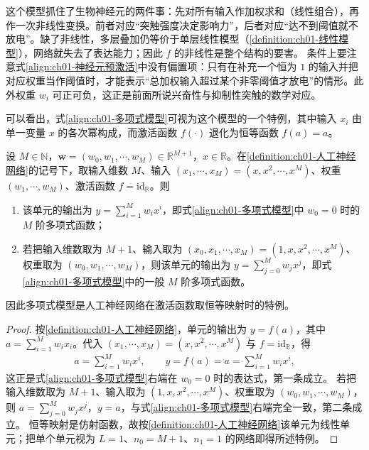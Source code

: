 \documentclass[../../main.tex]{subfiles}
\begin{document}
\begin{remark}
这个模型抓住了生物神经元的两件事：先对所有输入作加权求和（线性组合），再作一次非线性变换。前者对应“突触强度决定影响力”，后者对应“达不到阈值就不放电”。缺了非线性，多层叠加仍等价于单层线性模型（\cref{definition:ch01-线性模型}），网络就失去了表达能力；因此 $f$ 的非线性是整个结构的要害。
条件上要注意式\eqref{align:ch01-神经元预激活}中没有偏置项：只有在补充一个恒为 $1$ 的输入并把对应权重当作阈值时，才能表示“总加权输入超过某个非零阈值才放电”的情形。此外权重 $w_i$ 可正可负，这正是前面所说兴奋性与抑制性突触的数学对应。
\end{remark}

可以看出，式\eqref{align:ch01-多项式模型}可视为这个模型的一个特例，其中输入 $x_i$ 由单一变量 $x$ 的各次幂构成，而激活函数 $f(\cdot)$ 退化为恒等函数 $f(a)=a$。

\begin{proposition}[多项式函数是神经元模型的特例]\label{proposition:ch01-多项式是神经元特例}
设 $M\in\mathbb{N}$，$\mathbf{w}=(w_0,w_1,\cdots,w_M)\in\mathbb{R}^{M+1}$，$x\in\mathbb{R}$。在\cref{definition:ch01-人工神经网络}的记号下，取输入维数 $M$、输入 $(x_1,\cdots,x_M)=(x,x^{2},\cdots,x^{M})$、权重 $(w_1,\cdots,w_M)$、激活函数 $f=\mathrm{id}_{\mathbb{R}}$。则
\begin{enumerate}
  \item 该单元的输出为 $y=\sum_{i=1}^{M}w_ix^{i}$，即式\eqref{align:ch01-多项式模型}中 $w_0=0$ 时的 $M$ 阶多项式函数；
  \item 若把输入维数取为 $M+1$、输入取为 $(x_0,x_1,\cdots,x_M)=(1,x,x^{2},\cdots,x^{M})$、权重取为 $(w_0,w_1,\cdots,w_M)$，则该单元的输出为 $y=\sum_{j=0}^{M}w_jx^{j}$，即式\eqref{align:ch01-多项式模型}中的一般 $M$ 阶多项式函数。
\end{enumerate}
因此多项式模型是人工神经网络在激活函数取恒等映射时的特例。
\end{proposition}

\begin{proof}
按\cref{definition:ch01-人工神经网络}，单元的输出为 $y=f(a)$，其中 $a=\sum_{i=1}^{M}w_ix_i$。代入 $(x_1,\cdots,x_M)=(x,x^{2},\cdots,x^{M})$ 与 $f=\mathrm{id}_{\mathbb{R}}$，得
\begin{align*}
 a=\sum_{i=1}^{M}w_ix^{i},
 \qquad
 y=f(a)=a=\sum_{i=1}^{M}w_ix^{i},
\end{align*}
这正是式\eqref{align:ch01-多项式模型}右端在 $w_0=0$ 时的表达式，第一条成立。
若把输入维数取为 $M+1$、输入取为 $(1,x,x^{2},\cdots,x^{M})$、权重取为 $(w_0,w_1,\cdots,w_M)$，则 $a=\sum_{j=0}^{M}w_jx^{j}$，$y=a$，与式\eqref{align:ch01-多项式模型}右端完全一致，第二条成立。
恒等映射是仿射函数，故按\cref{definition:ch01-人工神经网络}该单元为线性单元；把单个单元视为 $L=1$、$n_{0}=M+1$、$n_{1}=1$ 的网络即得所述特例。
\end{proof}
\end{document}
